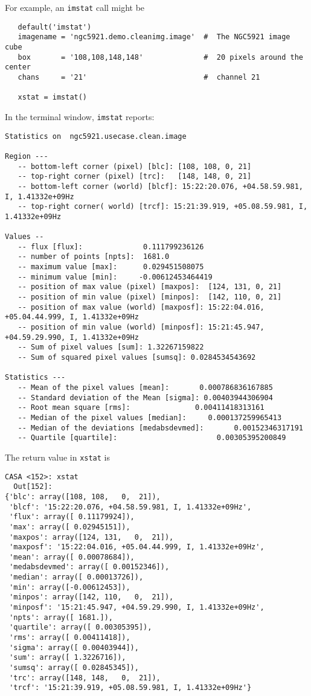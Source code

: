 For example, an {\tt imstat} call might be
\small
\begin{verbatim}
   default('imstat')
   imagename = 'ngc5921.demo.cleanimg.image'  #  The NGC5921 image cube
   box       = '108,108,148,148'              #  20 pixels around the center
   chans     = '21'                           #  channel 21

   xstat = imstat()
\end{verbatim}
\normalsize

In the terminal window, {\tt imstat} reports:
\small
\begin{verbatim}
Statistics on  ngc5921.usecase.clean.image

Region ---
   -- bottom-left corner (pixel) [blc]: [108, 108, 0, 21]
   -- top-right corner (pixel) [trc]:   [148, 148, 0, 21]
   -- bottom-left corner (world) [blcf]: 15:22:20.076, +04.58.59.981, I, 1.41332e+09Hz
   -- top-right corner( world) [trcf]: 15:21:39.919, +05.08.59.981, I, 1.41332e+09Hz

Values --
   -- flux [flux]:              0.111799236126
   -- number of points [npts]:  1681.0
   -- maximum value [max]:      0.029451508075
   -- minimum value [min]:     -0.00612453464419
   -- position of max value (pixel) [maxpos]:  [124, 131, 0, 21]
   -- position of min value (pixel) [minpos]:  [142, 110, 0, 21]
   -- position of max value (world) [maxposf]: 15:22:04.016, +05.04.44.999, I, 1.41332e+09Hz
   -- position of min value (world) [minposf]: 15:21:45.947, +04.59.29.990, I, 1.41332e+09Hz
   -- Sum of pixel values [sum]: 1.32267159822
   -- Sum of squared pixel values [sumsq]: 0.0284534543692
   
Statistics ---
   -- Mean of the pixel values [mean]:       0.000786836167885
   -- Standard deviation of the Mean [sigma]: 0.00403944306904
   -- Root mean square [rms]:               0.00411418313161
   -- Median of the pixel values [median]:     0.000137259965413
   -- Median of the deviations [medabsdevmed]:       0.00152346317191
   -- Quartile [quartile]:                       0.00305395200849

\end{verbatim}
\normalsize
The return value in {\tt xstat} is
\small
\begin{verbatim}
CASA <152>: xstat
  Out[152]: 
{'blc': array([108, 108,   0,  21]),
 'blcf': '15:22:20.076, +04.58.59.981, I, 1.41332e+09Hz',
 'flux': array([ 0.11179924]),
 'max': array([ 0.02945151]),
 'maxpos': array([124, 131,   0,  21]),
 'maxposf': '15:22:04.016, +05.04.44.999, I, 1.41332e+09Hz',
 'mean': array([ 0.00078684]),
 'medabsdevmed': array([ 0.00152346]),
 'median': array([ 0.00013726]),
 'min': array([-0.00612453]),
 'minpos': array([142, 110,   0,  21]),
 'minposf': '15:21:45.947, +04.59.29.990, I, 1.41332e+09Hz',
 'npts': array([ 1681.]),
 'quartile': array([ 0.00305395]),
 'rms': array([ 0.00411418]),
 'sigma': array([ 0.00403944]),
 'sum': array([ 1.3226716]),
 'sumsq': array([ 0.02845345]),
 'trc': array([148, 148,   0,  21]),
 'trcf': '15:21:39.919, +05.08.59.981, I, 1.41332e+09Hz'}
\end{verbatim}
\normalsize


